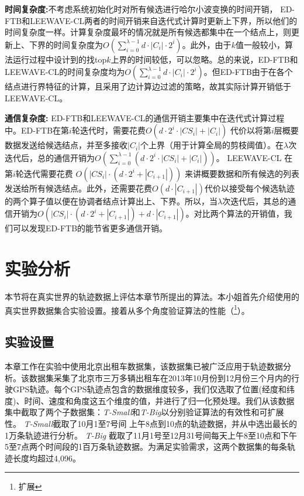   \textbf{时间复杂度:}不考虑系统初始化时对所有候选进行哈尔小波变换的时间开销， ED-FTB和LEEWAVE-CL两者的时间开销来自迭代式计算时更新上下界，所以他们的时间复杂度一样。计算复杂度最坏的情况就是所有候选都集中在一个结点上，则更新上、下界的时间复杂度为$O(\sum_{i=0}^{\lambda-1} d\cdot |C_{i}| \cdot 2^{i})$。此外，由于$k$值一般较小，算法运行过程中设计到的找top$k$上界的时间较低，可以忽略。总的来说，ED-FTB和LEEWAVE-CL的时间复杂度均为$O(\sum_{i=0}^{\lambda-1} d\cdot |C_{i}| \cdot 2^{i})$。但ED-FTB由于在各个结点进行界特征的计算，且采用了边计算边过滤的策略，故其实际计算开销低于LEEWAVE-CL。
 
  \textbf{通信复杂度:}
ED-FTB和LEEWAVE-CL的通信开销主要集中在迭代式计算过程中。ED-FTB在第$i$轮迭代时，需要花费$O(d\cdot 2^{i}\cdot |CS_{i}|+|C_{i}|)$ 代价以将第$i$层概要数据发送给候选结点，并至多接收$|C_{i}|$个上界（用于计算全局的剪枝阈值）。在$\lambda$次迭代后，总的通信开销为$O(\sum_{i=0}^{\lambda-1}(d \cdot 2^{i} \cdot|CS_{i}| + |C_{i}|))$。
LEEWAVE-CL 在第$i$轮迭代需要花费 $O(|CS_{i}| \cdot (d\cdot 2^{i}+ |C_{i+1}|))$ 来讲概要数据和所有候选的列表发送给所有候选结点。此外，还需要花费$O(d\cdot |C_{i+1}|)$代价以接受每个候选轨迹的两个算子值以便在协调者结点计算出上、下界。所以，当$\lambda$次迭代后，其总的通信开销为$O(|CS_{i}| \cdot (d\cdot 2^{i}+ |C_{i+1}|)+d\cdot |C_{i+1}|)$。对比两个算法的开销值，我们可以发现ED-FTB的能节省更多通信开销。
 
 \section{实验分析}\label{sec-c4-Exp}
本节将在真实世界的轨迹数据上评估本章节所提出的算法。本小姐首先介绍使用的真实世界数据集合实验设置。接着从多个角度验证算法的性能（\footnote{扩展}）。

\subsection{实验设置}
本章工作在实验中使用北京出租车数据集，该数据集已被广泛应用于轨迹数据分析。该数据集采集了北京市三万多辆出租车在2013年10月份到12月份三个月内的行驶GPS轨迹。每个GPS轨迹点包含的数据维度较多，我们仅选取了位置(经度和纬度)、时间、速度和角度这五个维度的值，并进行了归一化预处理。我们从该数据集中截取了两个子数据集：\emph{T-Small}和\emph{T-Big}以分别验证算法的有效性和可扩展性。
\emph{T-Small}截取了10月1至7号间 上午8点到10点的轨迹数据，并从中选出最长的1万条轨迹进行分析。
\emph{T-Big} 截取了11月1号至12月31号间每天上午8至10点和下午5至7点两个时间段的1百万条轨迹数据。为满足实验需求，这两个数据集的每条轨迹长度均超过4,096。

